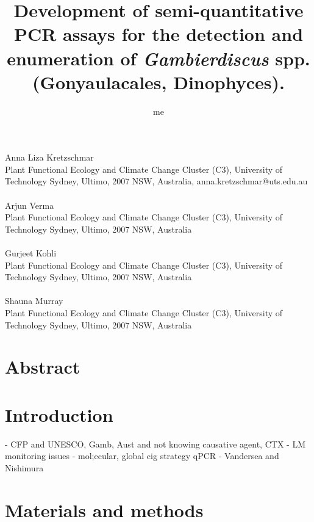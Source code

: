 \documentclass[12pt]{article}
\title{Development of semi-quantitative PCR assays for the detection and enumeration of \emph{Gambierdiscus} spp. (Gonyaulacales, Dinophyces).}
\author{me}
\date{}
\begin{document}
\maketitle
\paragraph{}Anna Liza Kretzschmar\\
Plant Functional Ecology and Climate Change Cluster (C3), University of Technology Sydney, Ultimo, 2007 NSW, Australia, anna.kretzschmar@uts.edu.au
\paragraph{}Arjun Verma \\
Plant Functional Ecology and Climate Change Cluster (C3), University of Technology Sydney, Ultimo, 2007 NSW, Australia
\paragraph{}Gurjeet Kohli\\ 
Plant Functional Ecology and Climate Change Cluster (C3), University of Technology Sydney, Ultimo, 2007 NSW, Australia
\paragraph{}Shauna Murray\\ 
Plant Functional Ecology and Climate Change Cluster (C3), University of Technology Sydney, Ultimo, 2007 NSW, Australia
\newpage
\section{Abstract}

\newpage
\section{Introduction}
- CFP and UNESCO, Gamb, Aust and not knowing causative agent, CTX
- LM monitoring issues - mol;ecular, global cig strategy qPCR
- Vandersea and Nishimura

\newpage
\section{Materials and methods}
\end{document}
